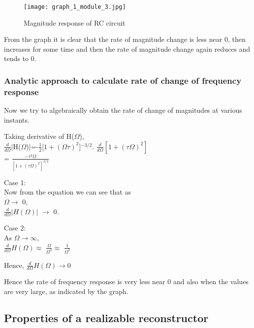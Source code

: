 \begin{figure}[ht]
\centering
\texttt{[image: graph\_1\_module\_3.jpg]}
\caption{\label{Graph:1} Magnitude response of RC circuit}
\end{figure}

\noindent From the graph it is clear that the rate of magnitude change is less near 0, then increases for some time and then the rate of magnitude change again reduces and tends to 0. 

\subsubsection{Analytic approach to calculate rate of change of frequency response}

Now we try to algebraically obtain the rate of change of magnitudes at various instants.

Taking derivative of H($\Omega$),\\
$\frac{d}{d\Omega}$|H($\Omega$)|=-$\frac{1}{2}$[$1+(\Omega \tau)^2$]$^{-3/2}$. $\frac{d}{d\Omega}[1+(\tau \Omega)^2]$
\\      
\vspace*{5mm}
=
$\frac{-\tau^2\Omega}{[1+(\tau\Omega)^2]^{3/2}}$

\noindent
Case 1:\\
Now from the equation we can see that as \\ $\Omega \rightarrow$ 0,\\
$\frac{d}{d\Omega}|H(\Omega)|$ $\rightarrow$ 0.


\vspace*{0.3 cm} 
\noindent
Case 2:\\
As $\Omega \rightarrow \infty$,\\
$\frac{d}{d\Omega}H(\Omega) \approx$ $\frac{\Omega}{\Omega^3} \approx $ $\frac{1}{\Omega^2}$

\vspace*{3 mm}
\noindent
Hence, 
	$\frac{d}{d\Omega}H(\Omega) \rightarrow 0$
\\ 
\vspace*{0.5 cm}

Hence the rate of frequency response is very less near 0 and also when the values are very large, as indicated by the graph.

\subsection{Properties of a realizable reconstructor}

